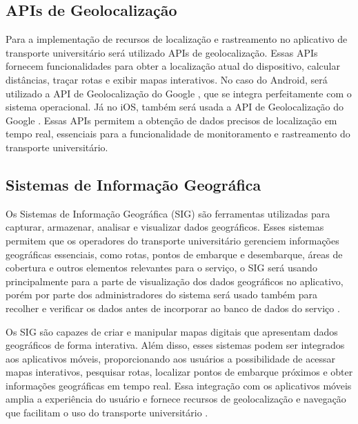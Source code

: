 \documentclass[
    12pt,                   %
    openright,              %
    oneside,                %
    a4paper,                %
    sumario=tradicional,    %
    english,                %
    brazil,                 %
    ]{abntex2}
\begin{document}
\newpage

\subsection{APIs de Geolocalização}
\label{subsec:apis-geolocalizacao}

Para a implementação de recursos de localização e rastreamento no aplicativo de transporte universitário será utilizado APIs de geolocalização. Essas APIs fornecem funcionalidades para obter a localização atual do dispositivo, calcular distâncias, traçar rotas e exibir mapas interativos. No caso do Android, será utilizado a API de Geolocalização do Google \cite{devmedia-google-maps}, que se integra perfeitamente com o sistema operacional. Já no iOS, também será usada a API de Geolocalização do Google \cite{devmedia-google-maps}. Essas APIs permitem a obtenção de dados precisos de localização em tempo real, essenciais para a funcionalidade de monitoramento e rastreamento do transporte universitário.

\subsection{Sistemas de Informação Geográfica}
\label{subsec:sistemas-informacao-geografica}

Os Sistemas de Informação Geográfica (SIG) são ferramentas utilizadas para capturar, armazenar, analisar e visualizar dados geográficos. Esses sistemas permitem que os operadores do transporte universitário gerenciem informações geográficas essenciais, como rotas, pontos de embarque e desembarque, áreas de cobertura e outros elementos relevantes para o serviço, o SIG será usando principalmente para a parte de visualização dos dados geográficos no aplicativo, porém por parte dos administradores do sistema será usado também para recolher e verificar os dados antes de incorporar ao banco de dados do serviço \cite{bolfe2018sistemas}.

Os SIG são capazes de criar e manipular mapas digitais que apresentam dados geográficos de forma interativa. Além disso, esses sistemas podem ser integrados aos aplicativos móveis, proporcionando aos usuários a possibilidade de acessar mapas interativos, pesquisar rotas, localizar pontos de embarque próximos e obter informações geográficas em tempo real. Essa integração com os aplicativos móveis amplia a experiência do usuário e fornece recursos de geolocalização e navegação que facilitam o uso do transporte universitário \cite{bolfe2018sistemas}.
\end{document}
